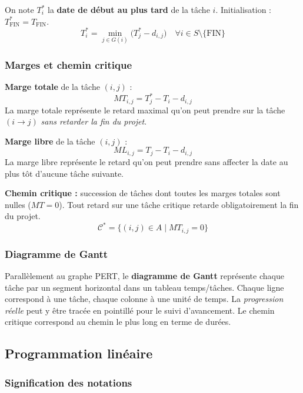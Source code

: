 \documentclass[12pt,a4paper]{article}
\begin{document}
On note $T^*_i$ la \textbf{date de début au plus tard} de la tâche $i$.
Initialisation : $T^*_{\text{FIN}} = T_{\text{FIN}}$.
\[
T^*_i = \min_{j \in G(i)}\bigl(T^*_j - d_{i,j}\bigr)
\quad\forall i \in S \setminus \{\text{FIN}\}
\]

\subsubsection{Marges et chemin critique}

\noindent\textbf{Marge totale} de la tâche $(i,j)$ :
\[
MT_{i,j} = T^*_j - T_i - d_{i,j}
\]
La marge totale représente le retard maximal qu'on peut prendre sur la tâche
$(i \to j)$ \emph{sans retarder la fin du projet}.

\noindent\textbf{Marge libre} de la tâche $(i,j)$ :
\[
ML_{i,j} = T_j - T_i - d_{i,j}
\]
La marge libre représente le retard qu'on peut prendre sans affecter la date
au plus tôt d'aucune tâche suivante.

\noindent\textbf{Chemin critique :} succession de tâches dont toutes les marges
totales sont nulles ($MT = 0$). Tout retard sur une tâche critique retarde
obligatoirement la fin du projet.
\[
\mathcal{C}^* = \bigl\{(i,j) \in A \mid MT_{i,j} = 0\bigr\}
\]

\subsubsection{Diagramme de Gantt}

Parallèlement au graphe PERT, le \textbf{diagramme de Gantt} représente chaque tâche
par un segment horizontal dans un tableau temps/tâches. Chaque ligne correspond à
une tâche, chaque colonne à une unité de temps. La \emph{progression réelle} peut
y être tracée en pointillé pour le suivi d'avancement. Le chemin critique correspond
au chemin le plus long en terme de durées.

\subsection{Programmation linéaire}

\subsubsection{Signification des notations}
\end{document}
